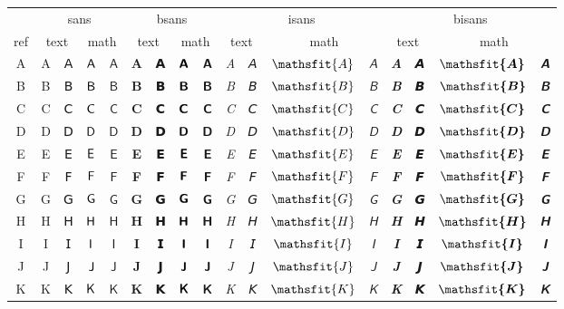 \documentclass{standalone}
\newcommand{\SANS}[1]{\ifmmode\mathsf{#1}\else\textsf{#1}\fi}
\newcommand{\BSANS}[1]{\ifmmode\boldsymbol{\mathsf{#1}}\else\textbf{\textsf{#1}}\fi}
\newcommand{\ISANS}[1]{\ifmmode\mathsfit{#1}\else\textit{\textsf{#1}}\fi}
\newcommand{\BISANS}[1]{\ifmmode\bm{\mathsfit{#1}}\else\textbf{\textsf{\textit{#1}}}\fi}
\begin{document}
\begin{tabular}{c|cc|cc|cc|cc|cc|cc|cc|cc}  %
\toprule
&\multicolumn{4}{c|}{sans} & \multicolumn{4}{|c}{bsans} & \multicolumn{4}{|c}{isans} & \multicolumn{4}{|c}{bisans} \\
ref&\multicolumn{2}{c|}{text} & \multicolumn{2}{|c|}{math} & \multicolumn{2}{|c|}{text} & \multicolumn{2}{|c}{math}
& \multicolumn{2}{|c|}{text} & \multicolumn{2}{|c}{math} & \multicolumn{2}{|c|}{text} & \multicolumn{2}{|c}{math} \\
\midrule
A & \SANS{A} & 𝖠 & $\SANS{A}$ & $𝖠$ & \BSANS{A} & 𝗔 & $\BSANS{A}$ & $𝗔$ & \ISANS{A} & 𝘈 & $\ISANS{A}$ & $𝘈$ & \BISANS{A} & 𝘼 & $\BISANS{A}$ & $𝘼$  \\
B & \SANS{B} & 𝖡 & $\SANS{B}$ & $𝖡$ & \BSANS{B} & 𝗕 & $\BSANS{B}$ & $𝗕$ & \ISANS{B} & 𝘉 & $\ISANS{B}$ & $𝘉$ & \BISANS{B} & 𝘽 & $\BISANS{B}$ & $𝘽$  \\
C & \SANS{C} & 𝖢 & $\SANS{C}$ & $𝖢$ & \BSANS{C} & 𝗖 & $\BSANS{C}$ & $𝗖$ & \ISANS{C} & 𝘊 & $\ISANS{C}$ & $𝘊$ & \BISANS{C} & 𝘾 & $\BISANS{C}$ & $𝘾$  \\
D & \SANS{D} & 𝖣 & $\SANS{D}$ & $𝖣$ & \BSANS{D} & 𝗗 & $\BSANS{D}$ & $𝗗$ & \ISANS{D} & 𝘋 & $\ISANS{D}$ & $𝘋$ & \BISANS{D} & 𝘿 & $\BISANS{D}$ & $𝘿$  \\
E & \SANS{E} & 𝖤 & $\SANS{E}$ & $𝖤$ & \BSANS{E} & 𝗘 & $\BSANS{E}$ & $𝗘$ & \ISANS{E} & 𝘌 & $\ISANS{E}$ & $𝘌$ & \BISANS{E} & 𝙀 & $\BISANS{E}$ & $𝙀$  \\
F & \SANS{F} & 𝖥 & $\SANS{F}$ & $𝖥$ & \BSANS{F} & 𝗙 & $\BSANS{F}$ & $𝗙$ & \ISANS{F} & 𝘍 & $\ISANS{F}$ & $𝘍$ & \BISANS{F} & 𝙁 & $\BISANS{F}$ & $𝙁$  \\
G & \SANS{G} & 𝖦 & $\SANS{G}$ & $𝖦$ & \BSANS{G} & 𝗚 & $\BSANS{G}$ & $𝗚$ & \ISANS{G} & 𝘎 & $\ISANS{G}$ & $𝘎$ & \BISANS{G} & 𝙂 & $\BISANS{G}$ & $𝙂$  \\
H & \SANS{H} & 𝖧 & $\SANS{H}$ & $𝖧$ & \BSANS{H} & 𝗛 & $\BSANS{H}$ & $𝗛$ & \ISANS{H} & 𝘏 & $\ISANS{H}$ & $𝘏$ & \BISANS{H} & 𝙃 & $\BISANS{H}$ & $𝙃$  \\
I & \SANS{I} & 𝖨 & $\SANS{I}$ & $𝖨$ & \BSANS{I} & 𝗜 & $\BSANS{I}$ & $𝗜$ & \ISANS{I} & 𝘐 & $\ISANS{I}$ & $𝘐$ & \BISANS{I} & 𝙄 & $\BISANS{I}$ & $𝙄$  \\
J & \SANS{J} & 𝖩 & $\SANS{J}$ & $𝖩$ & \BSANS{J} & 𝗝 & $\BSANS{J}$ & $𝗝$ & \ISANS{J} & 𝘑 & $\ISANS{J}$ & $𝘑$ & \BISANS{J} & 𝙅 & $\BISANS{J}$ & $𝙅$  \\
K & \SANS{K} & 𝖪 & $\SANS{K}$ & $𝖪$ & \BSANS{K} & 𝗞 & $\BSANS{K}$ & $𝗞$ & \ISANS{K} & 𝘒 & $\ISANS{K}$ & $𝘒$ & \BISANS{K} & 𝙆 & $\BISANS{K}$ & $𝙆$  \\

\end{tabular}
\end{document}
